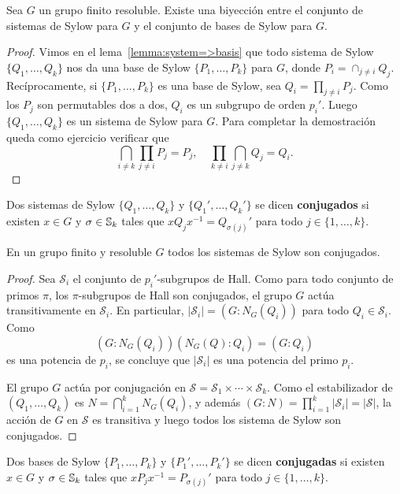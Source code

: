 \begin{proposition}
	\label{proposition:sistemas=bases}
	Sea $G$ un grupo finito resoluble. Existe una biyección entre el conjunto
	de sistemas de Sylow para $G$ y el conjunto de bases de Sylow para $G$. 
\end{proposition}

\begin{proof}
	Vimos en el lema~\ref{lemma:system=>basis} que todo sistema de Sylow
	$\{Q_1,\dots,Q_k\}$ nos da una base de Sylow $\{P_1,\dots,P_k\}$ para $G$,
	donde $P_i=\cap_{j\ne i}Q_j$. Recíprocamente, si $\{P_1,\dots,P_k\}$ es una
	base de Sylow, sea $Q_i=\prod_{j\ne i}P_j$. Como los $P_j$ son permutables
	dos a dos, $Q_i$ es un subgrupo de orden $p_i'$. Luego $\{Q_1,\dots,Q_k\}$
	es un sistema de Sylow para $G$. Para completar la demostración queda
	como ejercicio verificar que 
	\[
	\bigcap_{i\ne k}\prod_{j\ne i}P_j=P_j,\quad
	\prod_{k\ne i}\bigcap_{j\ne k}Q_j=Q_i.
	\]
\end{proof}

Dos sistemas de Sylow $\{Q_1,\dots,Q_k\}$ y $\{Q_1',\dots,Q_k'\}$ se dicen
\textbf{conjugados} si existen $x\in G$ y $\sigma\in\mathbb{S}_k$ tales que $xQ_jx^{-1}=Q_{\sigma(j)}'$ para todo
$j\in\{1,\dots,k\}$.

\begin{theorem}
	\label{theorem:sistemas_conj}
	En un grupo finito y resoluble $G$ todos los sistemas de Sylow son conjugados.
\end{theorem}

\begin{proof}
	Sea $\mathcal{S}_i$ el conjunto de $p_i'$-subgrupos de Hall. Como para todo
	conjunto de primos $\pi$, los $\pi$-subgrupos de Hall son conjugados, el
	grupo $G$ actúa transitivamente en $\mathcal{S}_i$. En particular, 
	$|\mathcal{S}_i|=(G:N_G(Q_i))$ para todo $Q_i\in\mathcal{S}_i$. Como
	\[
	(G:N_G(Q_i))(N_G(Q):Q_i)=(G:Q_i)
	\]
	es una potencia de $p_i$, se concluye que $|\mathcal{S}_i|$ es una potencia
	del primo $p_i$.
	
	El grupo $G$ actúa por conjugación en
	$\mathcal{S}=\mathcal{S}_1\times\cdots\times\mathcal{S}_k$. Como el
	estabilizador de $(Q_1,\dots,Q_k)$ es $N=\bigcap_{i=1}^k N_G(Q_i)$, y
	además $(G:N)=\prod_{i=1}^k|\mathcal{S}_i|=|\mathcal{S}|$, la acción de $G$
	en $\mathcal{S}$ es transitiva y luego todos los sistema de Sylow son
	conjugados.
\end{proof}

Dos bases de Sylow $\{P_1,\dots,P_k\}$ y $\{P_1',\dots,P_k'\}$ se dicen
\textbf{conjugadas} 
si existen $x\in G$ y $\sigma\in\mathbb{S}_k$ tales que $xP_jx^{-1}=P_{\sigma(j)}'$ para todo
$j\in\{1,\dots,k\}$.

